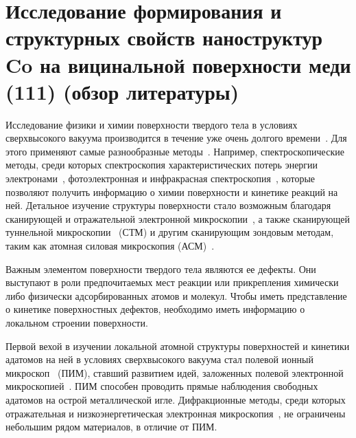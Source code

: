 
\chapter{Исследование формирования и структурных свойств наноструктур Co на вицинальной поверхности меди (111) (обзор литературы)}

Исследование физики и химии поверхности твердого тела в условиях сверхвысокого вакуума производится в течение уже очень долгого времени~\cite{Giesen2001}. Для этого применяют самые разнообразные методы~\cite{Oura2006}. Например, спектроскопические методы, среди которых спектроскопия характеристических потерь энергии электронами~\cite{Ibach1994,Ibach1991}, фотоэлектронная и инфракрасная спектроскопия~\cite{Greenler1966,Bradshaw1969,DUMAS1999}, которые позволяют получить информацию о химии поверхности и кинетике реакций на ней. Детальное изучение структуры поверхности стало возможным благодаря сканирующей и отражательной электронной микроскопии~\cite{Bauer1994,Bauer1994a}, а также сканирующей туннельной микроскопии~\cite{Binnig1982} (СТМ) и другим сканирующим зондовым методам, таким как атомная силовая микроскопия (АСМ)~\cite{PhysRevLett.56.930}.

Важным элементом поверхности твердого тела являются ее дефекты. Они выступают в роли предпочитаемых мест реакции или прикрепления химически либо физически адсорбированных атомов и молекул. Чтобы иметь представление о кинетике поверхностных дефектов, необходимо иметь информацию о локальном строении поверхности.

Первой вехой в изучении локальной атомной структуры поверхностей и кинетики адатомов на ней в условиях сверхвысокого вакуума стал полевой ионный микроскоп~\cite{Mller1951} (ПИМ), ставший развитием идей, заложенных полевой электронной микроскопией~\cite{Mller1937}. ПИМ способен проводить прямые наблюдения свободных адатомов на острой металлической игле.
Дифракционные методы, среди которых отражательная и низкоэнергетическая электронная микроскопия~\cite{Bauer1994,Bauer1994a}, не ограничены небольшим рядом материалов, в отличие от ПИМ.

